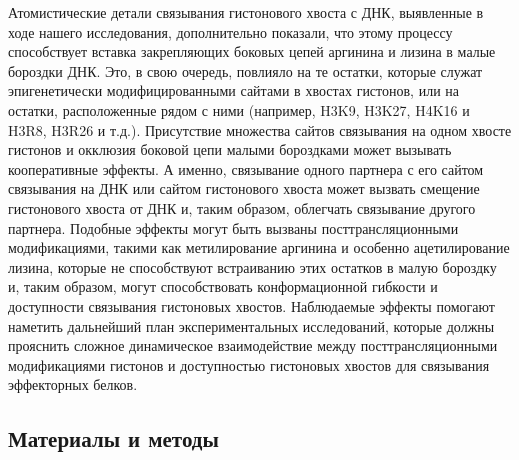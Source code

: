     Атомистические детали связывания гистонового хвоста с ДНК, выявленные в ходе нашего исследования, дополнительно показали, что этому процессу способствует вставка закрепляющих боковых цепей аргинина и лизина в малые бороздки ДНК. Это, в свою очередь, повлияло на те остатки, которые служат эпигенетически модифицированными сайтами в хвостах гистонов, или на остатки, расположенные рядом с ними (например, H3K9, H3K27, H4K16 и H3R8, H3R26 и т.д.). Присутствие множества сайтов связывания на одном хвосте гистонов и окклюзия боковой цепи малыми бороздками может вызывать кооперативные эффекты. А именно, связывание одного партнера с его сайтом связывания на ДНК или сайтом гистонового хвоста может вызвать смещение гистонового хвоста от ДНК и, таким образом, облегчать связывание другого партнера. Подобные эффекты могут быть вызваны посттрансляционными модификациями, такими как метилирование аргинина и особенно ацетилирование лизина, которые не способствуют встраиванию этих остатков в малую бороздку и, таким образом, могут способствовать конформационной гибкости и доступности связывания гистоновых хвостов. Наблюдаемые эффекты помогают наметить дальнейший план экспериментальных исследований, которые должны прояснить сложное динамическое взаимодействие между посттрансляционными модификациями гистонов и доступностью гистоновых хвостов для связывания эффекторных белков.

\subsection{Материалы и методы}
